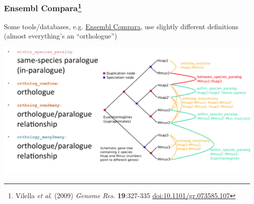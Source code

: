 %
\begin{frame}
  \frametitle{Ensembl Compara\footnote{\tiny{Vilella \textit{et al}. (2009) \textit{Genome Res.} \textbf{19}:327-335 \href{http://dx.doi.org/10.1101/gr.073585.107}{doi:10.1101/gr.073585.107}}}}
  Some tools/databases, e.g. \href{http://www.ensembl.org/info/genome/compara/index.html}{Ensembl Compara}, use slightly different definitions (almost everything's an ``orthologue'')
  \begin{center}
    \includegraphics[width=1\textwidth]{images/logues7}  
  \end{center} 
\end{frame}